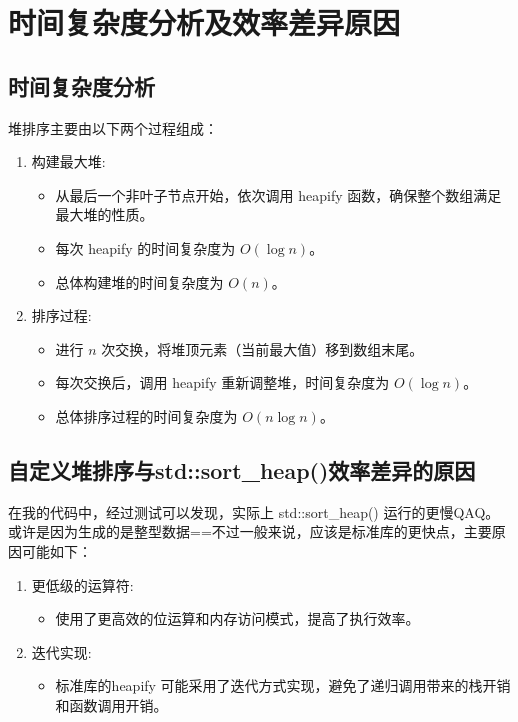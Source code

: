 \documentclass{article}
\begin{document}
\section{时间复杂度分析及效率差异原因}

\subsection{时间复杂度分析}

堆排序主要由以下两个过程组成：

\begin{enumerate}
    \item 构建最大堆:
    \begin{itemize}
        \item 从最后一个非叶子节点开始，依次调用 heapify 函数，确保整个数组满足最大堆的性质。
        \item 每次 heapify 的时间复杂度为 $O(\log n)$。
        \item 总体构建堆的时间复杂度为 $O(n)$。
    \end{itemize}

    \item 排序过程:
    \begin{itemize}
        \item 进行 $n$ 次交换，将堆顶元素（当前最大值）移到数组末尾。
        \item 每次交换后，调用 heapify 重新调整堆，时间复杂度为 $O(\log n)$。
        \item 总体排序过程的时间复杂度为 $O(n \log n)$。
    \end{itemize}
\end{enumerate}

\subsection{自定义堆排序与std::sort\_heap()效率差异的原因}

在我的代码中，经过测试可以发现，实际上 std::sort\_heap() 运行的更慢QAQ。或许是因为生成的是整型数据==不过一般来说，应该是标准库的更快点，主要原因可能如下：

    \begin{enumerate}
        \item 更低级的运算符:
            \begin{itemize}
                \item 使用了更高效的位运算和内存访问模式，提高了执行效率。
            \end{itemize}

        \item 迭代实现:
        \begin{itemize}
            \item 标准库的heapify 可能采用了迭代方式实现，避免了递归调用带来的栈开销和函数调用开销。
        \end{itemize}
    \end{enumerate}
\end{document}
